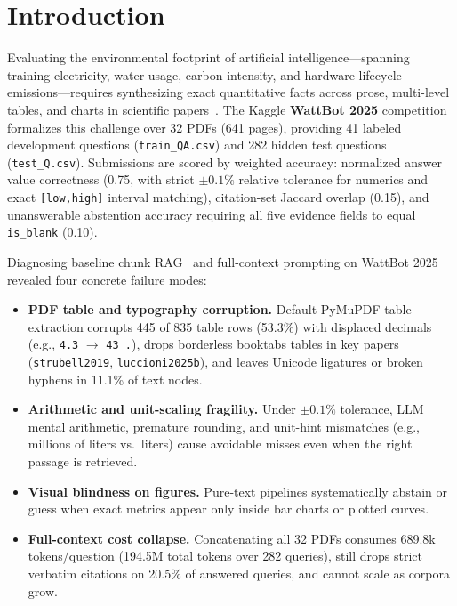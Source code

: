 \documentclass[sigconf,nonacm]{acmart}
\newcommand{\code}[1]{\texttt{\small #1}}
\begin{document}
\section{Introduction}
\label{sec:intro}

Evaluating the environmental footprint of artificial intelligence---spanning training electricity, water usage, carbon intensity, and hardware lifecycle emissions---requires synthesizing exact quantitative facts across prose, multi-level tables, and charts in scientific papers~\cite{strubell2019energy,patterson2021carbon}.
The Kaggle \textbf{WattBot 2025} competition formalizes this challenge over 32 PDFs (641 pages), providing 41 labeled development questions (\code{train\_QA.csv}) and 282 hidden test questions (\code{test\_Q.csv}).
Submissions are scored by weighted accuracy: normalized answer value correctness (0.75, with strict $\pm 0.1\%$ relative tolerance for numerics and exact \code{[low,high]} interval matching), citation-set Jaccard overlap (0.15), and unanswerable abstention accuracy requiring all five evidence fields to equal \code{is\_blank} (0.10).

Diagnosing baseline chunk RAG~\cite{lewis2020rag} and full-context prompting on WattBot 2025 revealed four concrete failure modes:
\begin{itemize}
  \item \textbf{PDF table and typography corruption.} Default PyMuPDF table extraction corrupts 445 of 835 table rows (53.3\%) with displaced decimals (e.g., \code{4.3} $\to$ \code{43 .}), drops borderless booktabs tables in key papers (\code{strubell2019}, \code{luccioni2025b}), and leaves Unicode ligatures or broken hyphens in 11.1\% of text nodes.
  \item \textbf{Arithmetic and unit-scaling fragility.} Under $\pm 0.1\%$ tolerance, LLM mental arithmetic, premature rounding, and unit-hint mismatches (e.g., millions of liters vs.\ liters) cause avoidable misses even when the right passage is retrieved.
  \item \textbf{Visual blindness on figures.} Pure-text pipelines systematically abstain or guess when exact metrics appear only inside bar charts or plotted curves.
  \item \textbf{Full-context cost collapse.} Concatenating all 32 PDFs consumes 689.8k tokens/question (194.5M total tokens over 282 queries), still drops strict verbatim citations on 20.5\% of answered queries, and cannot scale as corpora grow.
\end{itemize}
\end{document}
